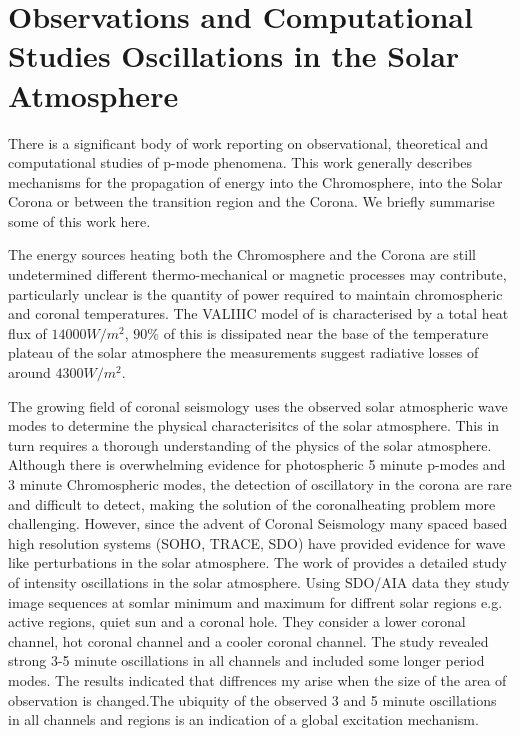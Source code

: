 \documentclass[final,1p]{elsarticle}
\begin{document}
\section{Observations and Computational Studies Oscillations in the Solar Atmosphere}

There is a significant body of work reporting on observational, theoretical and computational studies of p-mode phenomena. This work generally describes mechanisms for the propagation of energy into the Chromosphere, into the Solar Corona or between the transition region and the Corona. We briefly summarise some of this work here. 

The energy sources heating both the Chromosphere and the Corona are still undetermined different thermo-mechanical or magnetic processes may contribute, particularly unclear is the quantity of power required to maintain chromospheric and coronal temperatures.  The VALIIIC model of  \cite{Vernazza1981} is characterised by a total heat flux of $14000W/m^2$, $90\%$ of this is dissipated near the base of the temperature plateau of the solar atmosphere the measurements suggest radiative losses of around $4300W/m^2$.

The growing field of coronal seismology uses the observed solar atmospheric wave modes to determine the physical characterisitcs of the solar atmosphere. This in turn requires a thorough understanding of the physics of the solar atmosphere. Although there is overwhelming evidence for photospheric 5 minute p-modes and 3 minute Chromospheric modes, the detection of oscillatory in the corona are rare and difficult to detect, making the solution of the coronalheating problem more challenging. However, since the advent of Coronal Seismology \cite{Roberts1984} \cite{DeMoortel2005} many spaced based high resolution systems (SOHO, TRACE, SDO) have provided evidence for wave like perturbations in the solar atmosphere.
The work of \cite{Erdelyi2015} provides a detailed study of intensity oscillations in the solar atmosphere. Using SDO/AIA data they study image sequences at somlar minimum and maximum for diffrent solar regions e.g. active regions, quiet sun and a coronal hole. They consider a lower coronal channel, hot coronal channel and a cooler coronal channel. The study revealed strong 3-5 minute oscillations in all channels and included some longer period modes. The results indicated that diffrences my arise when the size of the area of observation is changed.The ubiquity of the observed 3 and 5 minute oscillations in all channels and regions is an indication of a global excitation mechanism.
\end{document}
